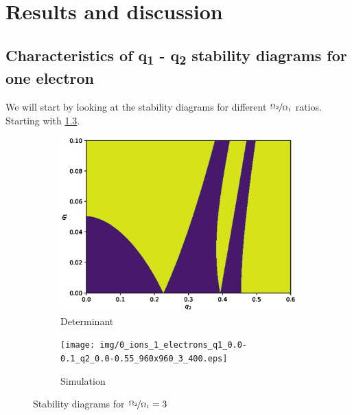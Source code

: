 \chapter{Results and discussion}

\section{Characteristics of q\textsubscript{1} - q\textsubscript{2} stability diagrams for one electron}


We will start by looking at the stability diagrams for different $\nicefrac{\Omega_2}{\Omega_1}$ ratios. Starting with \ref{fig:stabil-eta=3}.

\begin{figure}[H]
\begin{subfigure}{.5\textwidth}
  \centering
  \includegraphics[width=\linewidth]{img/q1_0.0-0.1_q2_0.0-0.6_500x500_3.eps}
  \caption{Determinant}
  \label{fig:det_3}
\end{subfigure}%
\begin{subfigure}{.5\textwidth}
  \centering
  \texttt{[image: img/0\_ions\_1\_electrons\_q1\_0.0-0.1\_q2\_0.0-0.55\_960x960\_3\_400.eps]}  
  \caption{Simulation}
  \label{fig:sim_3}
\end{subfigure}
\caption{Stability diagrams for $\nicefrac{\Omega_2}{\Omega_1} = 3$}
\label{fig:stabil-eta=3}
\end{figure}

